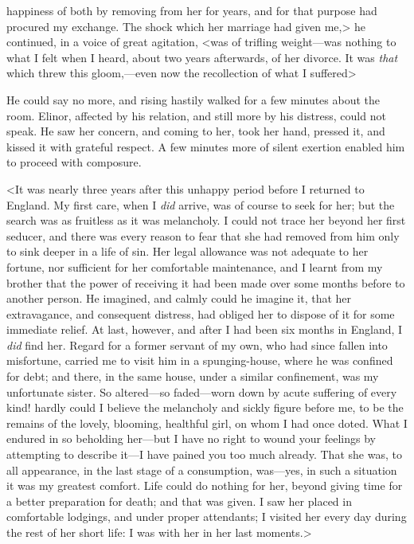 happiness of both by removing from her for years, and for that purpose had procured my exchange. The shock which her marriage had given me,> he continued, in a voice of great agitation, <was of trifling weight—was nothing to what I felt when I heard, about two years afterwards, of her divorce. It was \textit{that} which threw this gloom,—even now the recollection of what I suffered\longdash>

He could say no more, and rising hastily walked for a few minutes about the room. Elinor, affected by his relation, and still more by his distress, could not speak. He saw her concern, and coming to her, took her hand, pressed it, and kissed it with grateful respect. A few minutes more of silent exertion enabled him to proceed with composure.

<It was nearly three years after this unhappy period before I returned to England. My first care, when I \textit{did} arrive, was of course to seek for her; but the search was as fruitless as it was melancholy. I could not trace her beyond her first seducer, and there was every reason to fear that she had removed from him only to sink deeper in a life of sin. Her legal allowance was not adequate to her fortune, nor sufficient for her comfortable maintenance, and I learnt from my brother that the power of receiving it had been made over some months before to another person. He imagined, and calmly could he imagine it, that her extravagance, and consequent distress, had obliged her to dispose of it for some immediate relief. At last, however, and after I had been six months in England, I \textit{did} find her. Regard for a former servant of my own, who had since fallen into misfortune, carried me to visit him in a spunging-house, where he was confined for debt; and there, in the same house, under a similar confinement, was my unfortunate sister. So altered—so faded—worn down by acute suffering of every kind! hardly could I believe the melancholy and sickly figure before me, to be the remains of the lovely, blooming, healthful girl, on whom I had once doted. What I endured in so beholding her—but I have no right to wound your feelings by attempting to describe it—I have pained you too much already. That she was, to all appearance, in the last stage of a consumption, was—yes, in such a situation it was my greatest comfort. Life could do nothing for her, beyond giving time for a better preparation for death; and that was given. I saw her placed in comfortable lodgings, and under proper attendants; I visited her every day during the rest of her short life: I was with her in her last moments.>

